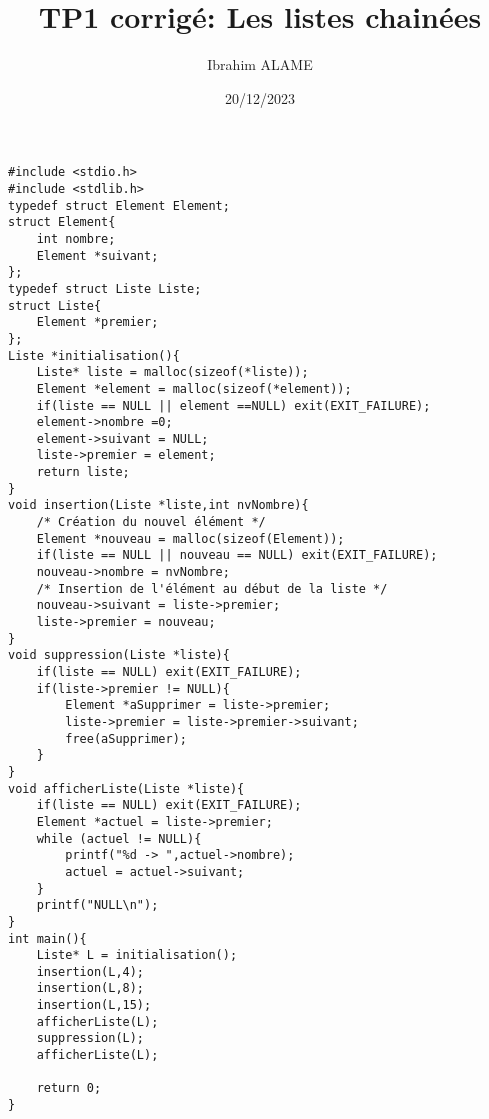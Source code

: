 \documentclass[a4paper]{article}
\title{TP1 corrigé: Les listes chainées}
\author{Ibrahim ALAME}
\date{20/12/2023}
\begin{document}
\maketitle


\begin{verbatim}
#include <stdio.h>
#include <stdlib.h>
typedef struct Element Element;
struct Element{
    int nombre;
    Element *suivant;
};
typedef struct Liste Liste;
struct Liste{
    Element *premier;
};
Liste *initialisation(){
    Liste* liste = malloc(sizeof(*liste));
    Element *element = malloc(sizeof(*element));
    if(liste == NULL || element ==NULL) exit(EXIT_FAILURE);
    element->nombre =0;
    element->suivant = NULL;
    liste->premier = element;
    return liste;
}
void insertion(Liste *liste,int nvNombre){
    /* Création du nouvel élément */
    Element *nouveau = malloc(sizeof(Element));
    if(liste == NULL || nouveau == NULL) exit(EXIT_FAILURE);
    nouveau->nombre = nvNombre;
    /* Insertion de l'élément au début de la liste */
    nouveau->suivant = liste->premier;
    liste->premier = nouveau;
}
void suppression(Liste *liste){
    if(liste == NULL) exit(EXIT_FAILURE);
    if(liste->premier != NULL){
        Element *aSupprimer = liste->premier;
        liste->premier = liste->premier->suivant;
        free(aSupprimer);
    }
}
void afficherListe(Liste *liste){
    if(liste == NULL) exit(EXIT_FAILURE);
    Element *actuel = liste->premier;
    while (actuel != NULL){
        printf("%d -> ",actuel->nombre);
        actuel = actuel->suivant;
    }
    printf("NULL\n");
}
int main(){
    Liste* L = initialisation();
    insertion(L,4);
    insertion(L,8);
    insertion(L,15);
    afficherListe(L);
    suppression(L);
    afficherListe(L);
    
    return 0;
}
\end{verbatim}
\end{document}
